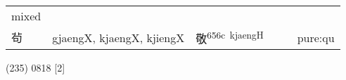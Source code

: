 \documentclass[14pt,a4paper]{scrartcl}
\begin{document}
\begin{longtable}[c]{@{}llllll@{}}
\begin{minipage}[t]{0.14\columnwidth}\raggedright\strut
mixed
\strut\end{minipage}\tabularnewline
\begin{minipage}[t]{0.14\columnwidth}\raggedright\strut
茍
\strut\end{minipage} &
\begin{minipage}[t]{0.14\columnwidth}\raggedright\strut
gjaengX, kjaengX, kjiengX
\strut\end{minipage} &
\begin{minipage}[t]{0.14\columnwidth}\raggedright\strut
敬\textsuperscript{656c~kjaengH}
\strut\end{minipage} &
\begin{minipage}[t]{0.14\columnwidth}\raggedright\strut
\strut\end{minipage} &
\begin{minipage}[t]{0.14\columnwidth}\raggedright\strut
\strut\end{minipage} &
\begin{minipage}[t]{0.14\columnwidth}\raggedright\strut
pure:qu
\strut\end{minipage}\tabularnewline
\bottomrule
\end{longtable}

(235) 0818 {[}2{]}
\end{document}
